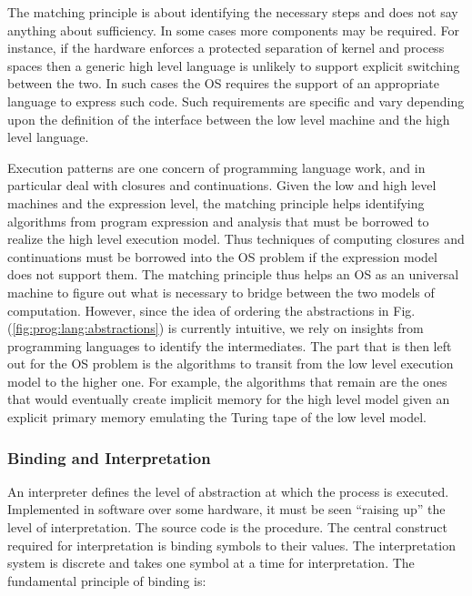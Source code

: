\documentclass[draft]{article}
\def\fig#1{Fig. (\ref{#1})}
\begin{document}
The matching  principle is about  identifying the necessary  steps and
does  not  say  anything   about  sufficiency.   In  some  cases  more
components may be required.  For  instance, if the hardware enforces a
protected separation of kernel and  process spaces then a generic high
level language  is unlikely to support explicit  switching between the
two.   In such cases  the OS  requires the  support of  an appropriate
language  to express such  code.  Such  requirements are  specific and
vary depending  upon the definition  of the interface between  the low
level machine and the high level language.

Execution patterns  are one concern of programming  language work, and
in particular deal with closures and continuations.  Given the low and
high level  machines and the expression level,  the matching principle
helps identifying algorithms from program expression and analysis that
must  be borrowed  to realize  the high  level execution  model.  Thus
techniques of  computing closures  and continuations must  be borrowed
into the  OS problem  if the expression  model does not  support them.
The matching  principle thus  helps an OS  as an universal  machine to
figure  out what  is necessary  to bridge  between the  two  models of
computation.  However, since the  idea of ordering the abstractions in
\fig{fig:prog:lang:abstractions}  is currently  intuitive, we  rely on
insights  from programming  languages to  identify  the intermediates.
The part that is then left out for the OS problem is the algorithms to
transit from  the low  level execution model  to the higher  one.  For
example, the algorithms that remain are the ones that would eventually
create  implicit memory  for the  high level  model given  an explicit
primary memory emulating the Turing tape of the low level model.

\subsubsection{Binding and Interpretation}
\label{sec:functional:end}

An interpreter defines  the level of abstraction at  which the process
is executed.  Implemented  in software over some hardware,  it must be
seen ``raising up''  the level of interpretation.  The  source code is
the procedure.   The central construct required  for interpretation is
binding  symbols  to  their  values.   The  interpretation  system  is
discrete  and takes  one symbol  at  a time  for interpretation.   The
fundamental principle of binding is:
\end{document}
